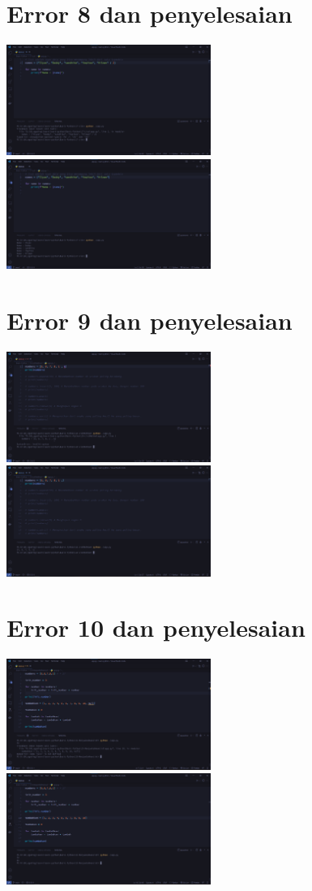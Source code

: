 \documentclass{article}
\begin{document}
\section{Error 8 dan penyelesaian}
\includegraphics[width=0.5\textwidth]{gambar/17_error.png}
\includegraphics[width=0.5\textwidth]{gambar/17_pengananan.png}

\section{Error 9 dan penyelesaian}
\includegraphics[width=0.5\textwidth]{gambar/18_error.png}
\includegraphics[width=0.5\textwidth]{gambar/18_pengananan.png}

\section{Error 10 dan penyelesaian}
\includegraphics[width=0.5\textwidth]{gambar/19_error.png}
\includegraphics[width=0.5\textwidth]{gambar/19_penanangan.png}
\end{document}
